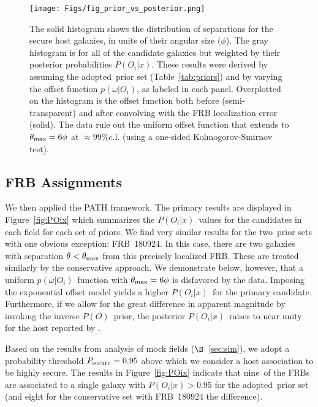 \documentclass[twocolumn,linenumbers]{aastex63}
\newcommand{\nsecure}{nine}  %
\newcommand{\mhalflight}{\phi} %
\newcommand{\halflight}{$\mhalflight$}
\newcommand{\mthmax}{\theta_{\rm max}}  %
\newcommand{\thmax}{$\mthmax$}
\newcommand{\mpoffset}{p(\omega|O_i)}  %
\newcommand{\poffset}{$\mpoffset$}
\newcommand{\mPO}{P(O)}  %
\newcommand{\PO}{$\mPO$}
\newcommand{\nsets}{two}  %
\newcommand{\adopted}{adopted}
\newcommand{\mPOix}{P(O_i|x)}  %
\newcommand{\POix}{$\mPOix$}
\newcommand{\mPOsec}{P_{\rm secure}}  %
\newcommand{\POvsec}{0.95}  %
\begin{document}
\begin{figure*}[!ht]
\centering
    \texttt{[image: Figs/fig\_prior\_vs\_posterior.png]}
    \caption{
    The solid histogram shows the distribution of separations for the secure
    host galaxies, in units of their angular size (\halflight).
    The gray histogram is for all of the candidate galaxies but weighted
    by their posterior probabilities \POix.
    These results were derived by assuming the 
    \adopted\ prior set (Table~\ref{tab:priors}) and by varying the 
    offset function \poffset, as labeled in each panel. 
    Overplotted on the histogram is the offset function both before
    (semi-transparent) and after convolving with the FRB localization 
    error (solid).  The data rule out 
    the uniform offset function that extends to
    $\mthmax = 6 \phi$  at $\approx 99\%$c.l.
    (using a one-sided Kolmogorov-Smirnov test). 
    } 
	\label{fig:poff_posterior}
\end{figure*}


\subsection{FRB Assignments}

We then applied the PATH framework. 
The primary results are displayed in Figure~\ref{fig:POix}
which summarizes the \POix\ values for the candidates
in each field for each set of priors.
We find very similar results for the \nsets~prior sets
with one obvious exception: FRB~180924.
In this case, there are two galaxies with separation
$\theta < \mthmax$ 
from this precisely localized FRB.
These are treated similarly by the conservative approach.
We demonstrate below, however, that a uniform \poffset\ 
function with $\mthmax = 6 \phi$
is disfavored by the data.
Imposing the exponential offset model yields 
a higher \POix\ for the primary candidate.
Furthermore, if we allow for the great difference
in apparent magnitude by invoking the 
inverse \PO\ prior, the posterior
\POix\ raises to near unity for the host
reported by \cite{Bannister19}.

Based on the results from analysis of mock fields
($\S$~\ref{sec:sim}), we adopt a probability 
threshold $\mPOsec = \POvsec$ above which we 
consider a host association to be highly secure.
The results in Figure~\ref{fig:POix}
indicate that \nsecure\ of the FRBs are
associated to a single galaxy with $\mPOix > \POvsec$ 
for the \adopted\ prior set 
(and eight for the conservative set with FRB~180924 the 
difference).
\end{document}
